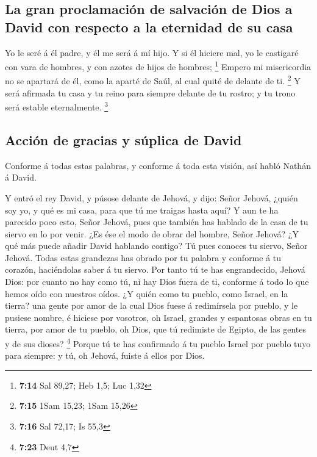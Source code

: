 \hypertarget{la-gran-proclamaciuxf3n-de-salvaciuxf3n-de-dios-a-david-con-respecto-a-la-eternidad-de-su-casa}{%
\subsection{La gran proclamación de salvación de Dios a David con
respecto a la eternidad de su
casa}\label{la-gran-proclamaciuxf3n-de-salvaciuxf3n-de-dios-a-david-con-respecto-a-la-eternidad-de-su-casa}}

 Yo le seré á él padre, y él me será á mí hijo. Y si él
hiciere mal, yo le castigaré con vara de hombres, y con azotes de hijos
de hombres; \footnote{\textbf{7:14} Sal 89,27; Heb 1,5; Luc 1,32}
 Empero mi misericordia no se apartará de él, como la
aparté de Saúl, al cual quité de delante de ti. \footnote{\textbf{7:15}
  1Sam 15,23; 1Sam 15,26}  Y será afirmada tu casa y tu
reino para siempre delante de tu rostro; y tu trono será estable
eternalmente. \footnote{\textbf{7:16} Sal 72,17; Is 55,3}

\hypertarget{acciuxf3n-de-gracias-y-suxfaplica-de-david}{%
\subsection{Acción de gracias y súplica de
David}\label{acciuxf3n-de-gracias-y-suxfaplica-de-david}}

 Conforme á todas estas palabras, y conforme á toda esta
visión, así habló Nathán á David.

 Y entró el rey David, y púsose delante de Jehová, y dijo:
Señor Jehová, ¿quién soy yo, y qué es mi casa, para que tú me traigas
hasta aquí?  Y aun te ha parecido poco esto, Señor Jehová,
pues que también has hablado de la casa de tu siervo en lo por venir.
¿Es ése el modo de obrar del hombre, Señor Jehová?  ¿Y qué
más puede añadir David hablando contigo? Tú pues conoces tu siervo,
Señor Jehová.  Todas estas grandezas has obrado por tu
palabra y conforme á tu corazón, haciéndolas saber á tu siervo.
 Por tanto tú te has engrandecido, Jehová Dios: por cuanto
no hay como tú, ni hay Dios fuera de ti, conforme á todo lo que hemos
oído con nuestros oídos.  ¿Y quién como tu pueblo, como
Israel, en la tierra? una gente por amor de la cual Dios fuese á
redimírsela por pueblo, y le pusiese nombre, é hiciese por vosotros, oh
Israel, grandes y espantosas obras en tu tierra, por amor de tu pueblo,
oh Dios, que tú redimiste de Egipto, de las gentes y de sus dioses?
\footnote{\textbf{7:23} Deut 4,7}  Porque tú te has
confirmado á tu pueblo Israel por pueblo tuyo para siempre: y tú, oh
Jehová, fuiste á ellos por Dios.

